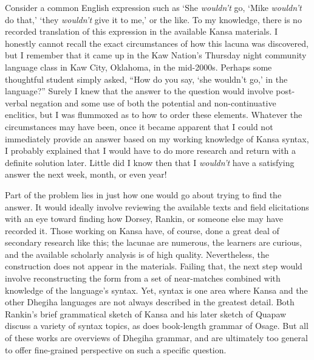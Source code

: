 \documentclass[output=paper]{LSP/langsci}
\begin{document}
Consider a common English expression such as `She \textit{wouldn't} go, `Mike \textit{wouldn't} do that,' `they \textit{wouldn't} give it to me,' or the like. To my knowledge, there is no recorded translation of this expression in the available Kansa materials. I honestly cannot recall the exact circumstances of how this lacuna was discovered, but I remember that it came up in the Kaw Nation's Thursday night community language class in Kaw City, Oklahoma, in the mid-2000s. Perhaps some thoughtful student simply asked, ``How do you say, `she wouldn't go,' in the language?'' Surely I knew that the answer to the question would involve post-verbal negation and some use of both the potential and non-continuative enclitics, but I was flummoxed as to how to order these elements. Whatever the circumstances may have been, once it became apparent that I could not immediately provide an answer based on my working knowledge of Kansa syntax, I probably explained that I would have to do more research and return with a definite solution later. Little did I know then that I \textit{wouldn't} have a satisfying answer the next week, month, or even year!

Part of the problem lies in just how one would go about trying to find the answer. It would ideally involve reviewing the available texts and field elicitations with an eye toward finding how Dorsey, Rankin, or someone else may have recorded it. Those working on Kansa have, of course, done a great deal of secondary research like this; the lacunae are numerous, the learners are curious, and the available scholarly analysis is of high quality. Nevertheless, the construction does not appear in the materials. Failing that, the next step would involve reconstructing the form from a set of near-matches combined with knowledge of the language's syntax. Yet, syntax is one area where Kansa and the other Dhegiha languages are not always described in the greatest detail. Both Rankin's brief grammatical sketch of Kansa \citeyear{Rankin1989} and his later sketch of Quapaw \citeyear{Rankin2005b} discuss a variety of syntax topics, as does  book-length grammar of Osage. But all of these works are overviews of Dhegiha grammar, and are ultimately too general to offer fine-grained perspective on such a specific question. 
\end{document}
